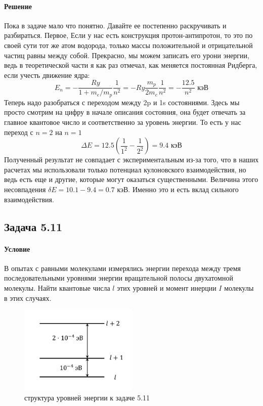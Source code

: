 \documentclass[12pt]{article}
\begin{document}
\paragraph{Решение}
Пока в задаче мало что понятно. Давайте ее постепенно раскручивать и разбираться. Первое, Если у нас есть конструкция протон-антипротон, то это по своей сути тот же атом водорода, только массы положительной и отрицательной частиц равны между собой. Прекрасно, мы можем записать его урони энергии, ведь в теоретической части я как раз отмечал, как меняется постоянная Ридберга, если учесть движение ядра:
\begin{equation*}
    E_n = - \dfrac{Ry}{1+m_e/m_p}\dfrac{1}{n^2} = -Ry\dfrac{m_p}{2m_e} \dfrac{1}{n^2} = -\dfrac{12.5}{n^2} \text{ кэВ}
\end{equation*}
Теперь надо разобраться с переходом между 2p и 1s состояниями. Здесь мы просто смотрим на цифру в начале описания состояния, она будет отвечать за главное квантовое число и соответственно за уровень энергии. То есть у нас переход с $n=2$ на $n=1$
\begin{equation*}
    \Delta E = 12.5\left(\dfrac{1}{1^2} - \dfrac{1}{2^2}\right) = 9.4 \text{ кэВ}
\end{equation*}
Полученный результат не совпадает с экспериментальным из-за того, что в наших расчетах мы использовали только потенциал кулоновского взаимодействия, но ведь есть еще и другие, которые могут оказаться существенными. Величина этого несовпадения $\delta E = 10.1 - 9.4 = 0.7$ кэВ. Именно это и есть вклад сильного взаимодействия. 

\subsection{Задача 5.11}
\label{task_5.11}
\paragraph{Условие} В опытах с равными молекулами измерялись энергии перехода между тремя последовательными уровнями энергии вращательной полосы двухатомной молекулы. Найти
квантовые числа $l$ этих уровней и момент инерции $I$ молекулы в этих случаях.
\begin{figure}[h]
    \centering
    \includegraphics[width=0.5\textwidth,height=\textheight,keepaspectratio]{Seminar_06/pics/pic_04.pdf}
    \caption{ структура уровней энергии к задаче 5.11}
\end{figure}
\end{document}
